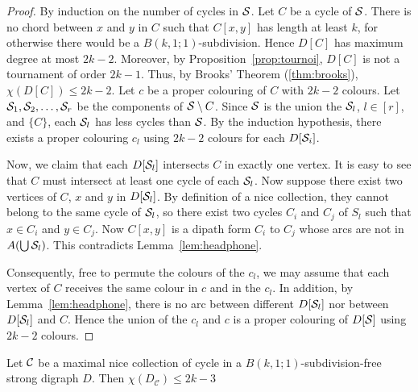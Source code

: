 \documentclass{endm}
\begin{document}
\begin{proof}
By induction on the number of cycles in ${\cal S}$. Let $C$ be a cycle of ${\cal S}$. There is no chord between $x$ and $y$ in $C$
such that $C[x,y]$ has length at least $k$, for otherwise there would be a $B(k,1;1)$-subdivision. Hence $D[C]$ has maximum degree at most $2k-2$. Moreover, by Proposition~\ref{prop:tournoi}, $D[C]$ is not a tournament of order $2k-1$.
Thus, by Brooks' Theorem (\ref{thm:brooks}), $\chi(D[C])\leq 2k-2$.
 Let $c$ be a proper colouring of $C$ with $2k-2$ colours. Let ${\cal S}_1, {\cal S}_2, \dots, {\cal S}_r$ be the components of ${\cal S} \setminus{C}$. Since ${\cal S}$ is the union the ${\cal S}_l$, $l\in [r]$, and $\{C\}$,
each ${\cal S}_l$ has less cycles than ${\cal S}$. By the induction hypothesis, there exists a proper colouring $c_l$ using $2k-2$ colours for each $D[{\cal S}_i]$.
 
Now, we claim that each $D[{\cal S}_l]$ intersects $C$ in exactly one vertex. It is easy to see that $C$ must intersect at least one cycle of each ${\cal S}_l$.
Now suppose there exist two vertices of $C$, $x$ and $y$ in $D[{\cal S}_l]$. By definition of a nice collection, they cannot belong to the same cycle 
of ${\cal S}_l$, so there exist two cycles $C_i$ and $C_j$ of $S_l$ such that $x \in C_i$ and $y \in C_j$. Now $C[x,y]$ is a dipath form $C_i$ to $C_j$ whose arcs are not in $A(\bigcup {\cal S}_l)$. This contradicts Lemma~\ref{lem:headphone}. 

Consequently, free to permute the colours of the $c_l$,
we may assume that each vertex of $C$ receives the same colour in $c$ and in the $c_l$. 
In addition, by Lemma~\ref{lem:headphone}, there is no arc between different $D[{\cal S}_l]$ nor between $D[{\cal S}_l]$ and $C$. Hence the union of the 
$c_l$ and $c$ is a proper colouring of $D[{\cal S}]$ using $2k-2$ colours. 
\end{proof}


\begin{lemma}\label{lem:reduce}
Let ${\cal C}$ be a maximal nice collection of cycle in a $B(k,1;1)$-subdivision-free strong digraph $D$. Then $\chi(D_{\mathcal{C}}) \leq 2k-3$
\end{lemma}
\end{document}
